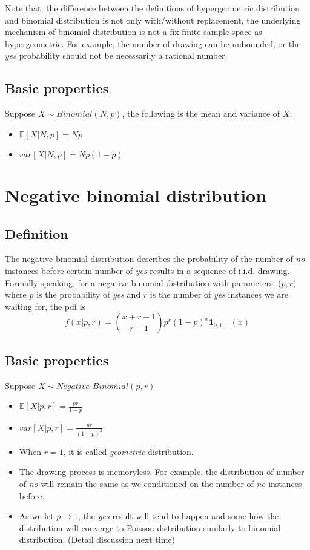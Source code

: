 \documentclass[../Distributions.tex]{subfiles}
\begin{document}
Note that, the difference between the definitions of hypergeometric distribution and binomial distribution is not only with/without replacement, the underlying mechanism of binomial distribution is not a fix finite sample space as hypergeometric. For example, the number of drawing can be unbounded, or the {\it yes} probability should not be necessarily a rational number.

\subsection{Basic properties}
Suppose $X\sim\textit{Binomial}(N,p)$, the following is the mean and variance of $X$:
\begin{itemize}
	\item $\mathbb{E}[X|N,p] = Np$
	\item $var[X|N,p] = Np(1-p)$
\end{itemize}

\section{Negative binomial distribution}
\subsection{Definition}
The negative binomial distribution describes the probability of the number of {\it no} instances before certain number of {\it yes} results in a sequence of i.i.d. drawing. Formally speaking, for a negative binomial distribution with parameters: ($p,r$) where $p$ is the probability of {\it yes} and $r$ is the number of {\it yes} instances we are waiting for, the pdf is
$$f(x|p,r) = {x+r-1\choose r-1}p^r(1-p)^x\mathbf{1}_{0,1,...}(x)$$

\subsection{Basic properties}
Suppose $X\sim\textit{Negative Binomial}(p,r)$
\begin{itemize}
	\item $\mathbb{E}[X|p,r] = \frac{pr}{1-p}$
	\item $var[X|p,r]=\frac{pr}{(1-p)^2}$
	\item When $r=1$, it is called {\it geometric} distribution.
	\item The drawing process is memoryless. For example, the distribution of number of {\it no} will remain the same as we conditioned on the number of {\it no} instances before.
	\item As we let $p\rightarrow1$, the {\it yes} result will tend to happen and some how the distribution will converge to Poisson distribution similarly to binomial distribution. (Detail discussion next time)
\end{itemize}
\end{document}

